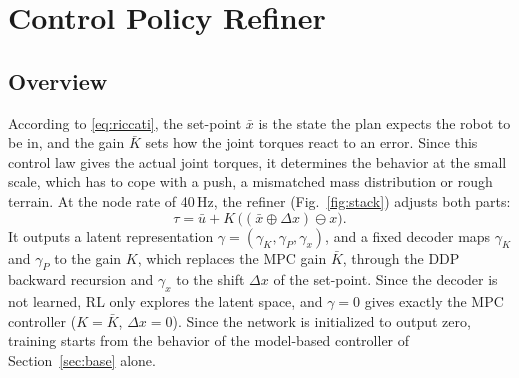 \documentclass[conference]{IEEEtran}
\newcommand{\xb}{\bar{x}}
\newcommand{\ub}{\bar{u}}
\begin{document}
\section{Control Policy Refiner}
\label{sec:method}


\subsection{Overview}
According to \eqref{eq:riccati}, the set-point $\xb$ is the state the plan expects the robot to be in, and the gain $\bar K$ sets how the joint torques react to an error.
Since this control law gives the actual joint torques, it determines the behavior at the small scale, which has to cope with a push, a mismatched mass distribution or rough terrain.
At the node rate of 40\,Hz, the refiner (Fig.~\ref{fig:stack}) adjusts both parts:
\begin{equation}
\tau=\ub+K\,\big((\xb\oplus\Delta x)\ominus x\big).
\label{eq:refined}
\end{equation}
It outputs a latent representation $\gamma=(\gamma_K,\gamma_P,\gamma_x)$, and a fixed decoder maps $\gamma_K$ and $\gamma_P$ to the gain $K$, which replaces the MPC gain $\bar K$, through the DDP backward recursion and $\gamma_x$ to the shift $\Delta x$ of the set-point.
Since the decoder is not learned, RL only explores the latent space, and $\gamma=0$ gives exactly the MPC controller ($K=\bar K$, $\Delta x=0$).
Since the network is initialized to output zero, training starts from the behavior of the model-based controller of Section~\ref{sec:base} alone.
\end{document}
